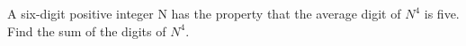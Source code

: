 A six-digit positive integer N has the property that the average digit of $N^4$ is five. Find the sum of the digits of $N^4$.
